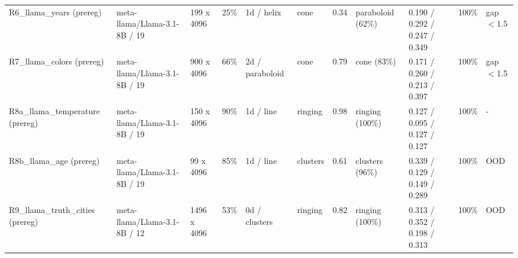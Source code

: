 \begin{tabular}{lllllllllll}
R6\_llama\_years (prereg) & meta-llama/Llama-3.1-8B / 19 & 199 x 4096 & 25\% & 1d / helix & cone & 0.34 & paraboloid (62\%) & 0.190 / 0.292 / 0.247 / 0.349 & 100\% & gap$<$1.5 \\
R7\_llama\_colors (prereg) & meta-llama/Llama-3.1-8B / 19 & 900 x 4096 & 66\% & 2d / paraboloid & cone & 0.79 & cone (83\%) & 0.171 / 0.260 / 0.213 / 0.397 & 100\% & gap$<$1.5 \\
R8a\_llama\_temperature (prereg) & meta-llama/Llama-3.1-8B / 19 & 150 x 4096 & 90\% & 1d / line & ringing & 0.98 & ringing (100\%) & 0.127 / 0.095 / 0.127 / 0.127 & 100\% & - \\
R8b\_llama\_age (prereg) & meta-llama/Llama-3.1-8B / 19 & 99 x 4096 & 85\% & 1d / line & clusters & 0.61 & clusters (96\%) & 0.339 / 0.129 / 0.149 / 0.289 & 100\% & OOD \\
R9\_llama\_truth\_cities (prereg) & meta-llama/Llama-3.1-8B / 12 & 1496 x 4096 & 53\% & 0d / clusters & ringing & 0.82 & ringing (100\%) & 0.313 / 0.352 / 0.198 / 0.313 & 100\% & OOD \\
\bottomrule
\end{tabular}
